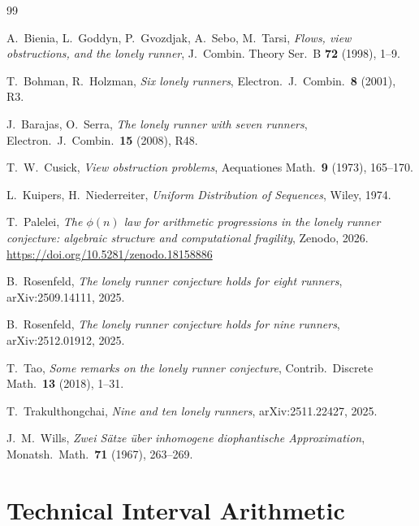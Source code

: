 \documentclass[12pt,a4paper]{amsart}
\theoremstyle{definition}
\theoremstyle{remark}
\begin{document}
\begin{thebibliography}{99}

A.~Bienia, L.~Goddyn, P.~Gvozdjak, A.~Sebo, M.~Tarsi,
\textit{Flows, view obstructions, and the lonely runner},
J.~Combin. Theory Ser.~B \textbf{72} (1998), 1--9.

T.~Bohman, R.~Holzman,
\textit{Six lonely runners},
Electron.\ J.\ Combin.\ \textbf{8} (2001), R3.

J.~Barajas, O.~Serra,
\textit{The lonely runner with seven runners},
Electron.\ J.\ Combin.\ \textbf{15} (2008), R48.

T.~W.~Cusick,
\textit{View obstruction problems},
Aequationes Math.\ \textbf{9} (1973), 165--170.

L.~Kuipers, H.~Niederreiter,
\textit{Uniform Distribution of Sequences},
Wiley, 1974.

T.~Palelei,
\textit{The $\phi(n)$ law for arithmetic progressions in the lonely runner conjecture: algebraic structure and computational fragility},
Zenodo, 2026. \url{https://doi.org/10.5281/zenodo.18158886}

B.~Rosenfeld,
\textit{The lonely runner conjecture holds for eight runners},
arXiv:2509.14111, 2025.

B.~Rosenfeld,
\textit{The lonely runner conjecture holds for nine runners},
arXiv:2512.01912, 2025.

T.~Tao,
\textit{Some remarks on the lonely runner conjecture},
Contrib.\ Discrete Math.\ \textbf{13} (2018), 1--31.

T.~Trakulthongchai,
\textit{Nine and ten lonely runners},
arXiv:2511.22427, 2025.

J.~M.~Wills,
\textit{Zwei S\"atze \"uber inhomogene diophantische Approximation},
Monatsh.\ Math.\ \textbf{71} (1967), 263--269.

\end{thebibliography}

\appendix

\section{Technical Interval Arithmetic}
\end{document}
